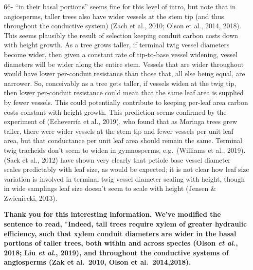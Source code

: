 \documentclass[
]{article}
\begin{document}
66- ``in their basal portions'' seems fine for this level of intro, but
note that in angiosperms, taller trees also have wider vessels at the
stem tip (and thus throughout the conductive system) (Zach et al., 2010;
Olson et al., 2014, 2018). This seems plausibly the result of selection
keeping conduit carbon costs down with height growth. As a tree grows
taller, if terminal twig vessel diameters become wider, then given a
constant rate of tip-to-base vessel widening, vessel diameters will be
wider along the entire stem. Vessels that are wider throughout would
have lower per-conduit resistance than those that, all else being equal,
are narrower. So, conceivably as a tree gets taller, if vessels widen at
the twig tip, then lower per-conduit resistance could mean that the same
leaf area is supplied by fewer vessels. This could potentially
contribute to keeping per-leaf area carbon costs constant with height
growth. This prediction seems confirmed by the experiment of (Echeverría
et al., 2019), who found that as Moringa trees grew taller, there were
wider vessels at the stem tip and fewer vessels per unit leaf area, but
that conductance per unit leaf area should remain the same. Terminal
twig tracheids don't seem to widen in gymnosperms, e.g.~(Williams et
al., 2019). (Sack et al., 2012) have shown very clearly that petiole
base vessel diameter scales predictably with leaf size, as would be
expected; it is not clear how leaf size variation is involved in
terminal twig vessel diameter scaling with height, though in wide
samplings leaf size doesn't seem to scale with height (Jensen \&
Zwieniecki, 2013).

\textbf{Thank you for this interesting information. We've modified the
sentence to read, "Indeed, tall trees require xylem of greater hydraulic
efficiency, such that xylem conduit diameters are wider in the basal
portions of taller trees, both within and across species (Olson \emph{et
al.}, 2018; Liu \emph{et al.}, 2019), and throughout the conductive
systems of angiosperms (Zak et al.~2010, Olson et al.~2014,2018).}
\end{document}
